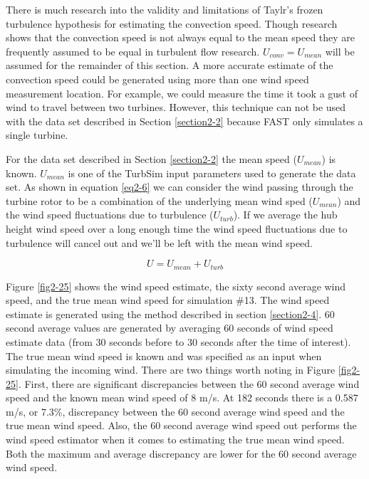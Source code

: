 There is much research into the validity and limitations of Taylr's frozen turbulence hypothesis for estimating the convection speed. \cite{dennis2008,goldschmidt1981,delalamo2009,atkinson2015} Though research shows that the convection speed is not always equal to the mean speed they are frequently assumed to be equal in turbulent flow research. $U_{conv} = U_{mean}$ will be assumed for the remainder of this section. A more accurate estimate of the convection speed could be generated using more than one wind speed measurement location. For example, we could measure the time it took a gust of wind to travel between two turbines. However, this technique can not be used with the data set described in Section \ref{section2-2} because FAST only simulates a single turbine.

For the data set described in Section \ref{section2-2} the mean speed ($U_{mean}$) is known. $U_{mean}$ is one of the TurbSim input parameters used to generate the data set. As shown in equation \ref{eq2-6} we can consider the wind passing through the turbine rotor to be a combination of the underlying mean wind sped ($U_{mean}$) and the wind speed fluctuations due to turbulence ($U_{turb}$). If we average the hub height wind speed over a long enough time the wind speed fluctuations due to turbulence will cancel out and we'll be left with the mean wind speed. 


\begin{equation}
	 U =  U_{mean} +U_{turb}  \label{eq2-6}
\end{equation}

Figure \ref{fig2-25} shows the wind speed estimate, the sixty second average wind speed, and the true mean wind speed for simulation \#13. The wind speed estimate is generated using the method described in section \ref{section2-4}. 60 second average values are generated by averaging 60 seconds of wind speed estimate data (from 30 seconds before to 30 seconds after the time of interest). The true mean wind speed is known and was specified as an input when simulating the incoming wind. There are two things worth noting in Figure \ref{fig2-25}. First, there are significant discrepancies between the 60 second average wind speed and the known mean wind speed of 8 m/s. At 182 seconds there is a 0.587 m/s, or 7.3\%,  discrepancy between the 60 second average wind speed and the true mean wind speed. Also, the 60 second average wind speed out performs the wind speed estimator when it comes to estimating the true mean wind speed. Both the maximum and average discrepancy are lower for the 60 second average wind speed. 

